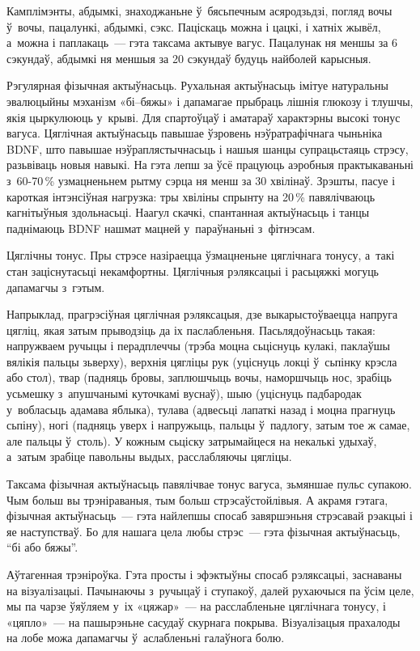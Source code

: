 Камплімэнты, абдымкі, знаходжаньне ў~бясьпечным асяродзьдзі, погляд вочы ў~вочы, пацалункі, абдымкі, сэкс. Паціскаць можна і цацкі, і хатніх жывёл, а~можна і паплакаць~--- гэта таксама актывуе вагус. Пацалунак ня меншы за 6 сэкундаў, абдымкі ня меншыя за 20 сэкундаў будуць найболей карысныя.

Рэгулярная фізычная актыўнасьць. Рухальная актыўнасьць імітуе натуральны эвалюцыйны мэханізм «бі--бяжы» і дапамагае прыбраць лішнія глюкозу і тлушчы, якія цыркулююць у~крыві. Для спартоўцаў і аматараў характэрны высокі тонус вагуса. Цяглічная актыўнасьць павышае ўзровень нэўратрафічнага чыньніка BDNF, што павышае нэўраплястычнасьць і нашыя шанцы супрацьстаяць стрэсу, разьвіваць новыя навыкі. На гэта лепш за ўсё працуюць аэробныя практыкаваньні з~60-70\,\% узмацненьнем рытму сэрца ня менш за 30 хвілінаў. Зрэшты, пасуе і кароткая інтэнсіўная нагрузка: тры хвіліны спрынту на 20\,\% павялічваюць кагнітыўныя здольнасьці. Наагул скачкі, спантанная актыўнасьць і танцы паднімаюць BDNF нашмат мацней у~параўнаньні з~фітнэсам.

Цяглічны тонус. Пры стрэсе назіраецца ўзмацненьне цяглічнага тонусу, а~такі стан заціснутасьці некамфортны. Цяглічныя рэляксацыі і расьцяжкі могуць дапамагчы з~гэтым. 

Напрыклад, прагрэсіўная цяглічная рэляксацыя, дзе выкарыстоўваецца напруга цягліц, якая затым прыводзіць да іх паслабленьня. Пасьлядоўнасьць такая: напружваем ручыцы і перадплеччы (трэба моцна сьціснуць кулакі, паклаўшы вялікія пальцы зьверху), верхнія цягліцы рук (уціснуць локці ў~сьпінку крэсла або стол), твар (падняць бровы, заплюшчыць вочы, наморшчыць нос, зрабіць усьмешку з~апушчанымі куточкамі вуснаў), шыю (уціснуць падбародак у~вобласьць адамава яблыка), тулава (адвесьці лапаткі назад і моцна прагнуць сьпіну), ногі (падняць уверх і напружыць, пальцы ў~падлогу, затым тое ж самае, але пальцы ў~столь). У кожным сьціску затрымайцеся на некалькі удыхаў, а~затым зрабіце павольны выдых, расслабляючы цягліцы.

Таксама фізычная актыўнасьць павялічвае тонус вагуса, зьмяншае пульс супакою. Чым больш вы трэніраваныя, тым больш стрэсаўстойлівыя. А акрамя гэтага, фізычная актыўнасьць~--- гэта найлепшы спосаб завяршэньня стрэсавай рэакцыі і яе наступстваў. Бо для нашага цела любы стрэс~--- гэта фізычная актыўнасьць, ``бі або бяжы''.

Аўтагенная трэніроўка. Гэта просты і эфэктыўны спосаб рэляксацыі, заснаваны на візуалізацыі. Пачынаючы з~ручыцаў і ступакоў, далей рухаючыся па ўсім целе, мы па чарзе ўяўляем у~іх «цяжар»~--- на расслабленьне цяглічнага тонусу, і «цяпло»~--- на пашырэньне сасудаў скурнага покрыва. Візуалізацыя прахалоды на лобе можа дапамагчы ў~аслабленьні галаўнога болю.

